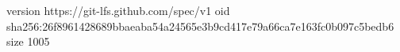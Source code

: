 version https://git-lfs.github.com/spec/v1
oid sha256:26f8961428689bbaeaba54a24565e3b9cd417e79a66ca7e163fc0b097c5bedb6
size 1005
